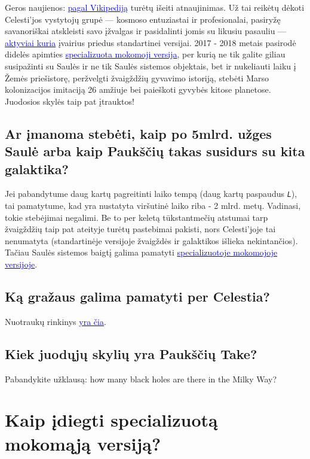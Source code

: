 \documentclass[a4paper]{article}
\newcommand{\goto}[2]{\href{\detokenize{#1}}{\textcolor{blue}{#2}}}
\begin{document}
Geros naujienos: \goto{https://en.wikipedia.org/wiki/Celestia}{pagal Vikipediją} turėtų išeiti atnaujinimas. Už tai reikėtų dėkoti Celesti'jos vystytojų grupė --- kosmoso entuziastai ir profesionalai, pasiryžę savanoriškai atskleisti savo įžvalgas ir pasidalinti jomis su likusiu pasauliu --- \goto{http://www.celestiamotherlode.net/}{aktyviai kuria} įvairius priedus standartinei versijai. 2017 - 2018 metais pasirodė didelės apimties \goto{http://www.celestiamotherlode.net/catalog/educational.php}{specializuota mokomoji versija}, per kurią ne tik galite giliau susipažinti su Saulės ir ne tik Saulės sistemos objektais, bet ir nukeliauti laiku į Žemės priešistorę, peržvelgti žvaigždžių gyvavimo istoriją, stebėti Marso kolonizacijos imitaciją 26 amžiuje bei paieškoti gyvybės kitose planetose. Juodosios skylės taip pat įtrauktos!
 
\subsection*{Ar įmanoma stebėti, kaip po 5mlrd. užges Saulė arba kaip Paukščių takas susidurs su kita galaktika?}
 
Jei pabandytume daug kartų pagreitinti laiko tempą (daug kartų paspaudus \texttt{\textit{L}}), tai pamatytume, kad yra nustatyta viršutinė laiko riba - 2 mlrd. metų. Vadinasi, tokie stebėjimai negalimi. Be to  per keletą tūkstantmečių atstumai tarp žvaigždžių taip pat ateityje turėtų pastebimai pakisti, nors Celesti'joje tai nenumatyta (standartinėje versijoje žvaigždės ir galaktikos išlieka nekintančios). Tačiau Saulės sistemos baigtį galima pamatyti \goto{http://www.celestiamotherlode.net/catalog/educational.php}{specializuotoje mokomojoje versijoje}.

\subsection*{Ką gražaus galima pamatyti per Celestia?}
Nuotraukų rinkinys \goto{https://celestia.space/gallery.html}{yra čia}.

\subsection*{Kiek juodųjų skylių yra Paukščių Take?}

Pabandykite užklausą: how many black holes are there in the Milky Way?

\section*{Kaip įdiegti specializuotą mokomąją versiją?}
\end{document}
